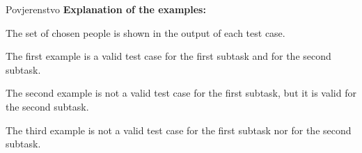 \begin{statement}[
  problempoints=100,
  timelimit=3 sekunde,
  memorylimit=512 MiB,
]{Povjerenstvo}
\textbf{Explanation of the examples:}

The set of chosen people is shown in the output of each test case.

The first example is a valid test case for the first subtask and for the second subtask.

The second example is not a valid test case for the first subtask, but it is valid for the second subtask.

The third example is not a valid test case for the first subtask nor for the second subtask.

\end{statement}

